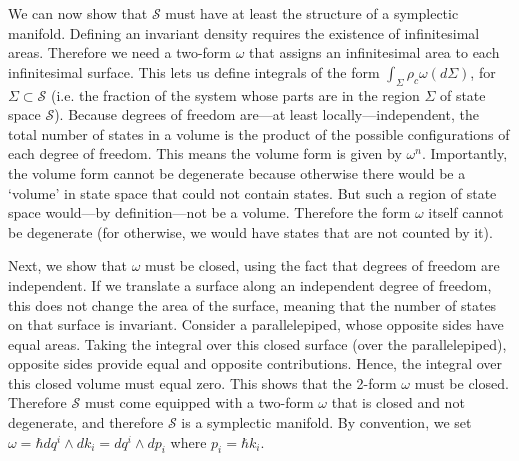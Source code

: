 \documentclass[letterpaper]{article}
\begin{document}
We can now show that $\mathcal{S}$ must have at least the structure of a symplectic manifold. Defining an invariant density requires the existence of infinitesimal areas. Therefore we need a two-form $\omega$ that assigns an infinitesimal area to each infinitesimal surface. This lets us define integrals of the form $\int_{\Sigma} \rho_c \omega(d\Sigma)$, for $\Sigma \subset \mathcal{S}$ (i.e. the fraction of the system whose parts are in the region $\Sigma$ of state space $\mathcal{S}$). Because degrees of freedom are---at least locally---independent, the total number of states in a volume is the product of the possible configurations of each degree of freedom. This means the volume form is given by $\omega^n$. Importantly, the volume form cannot be degenerate because otherwise there would be a `volume' in state space that could not contain states. But such a region of state space would---by definition---not be a volume. Therefore the form $\omega$ itself cannot be degenerate (for otherwise, we would have states that are not counted by it). 

Next, we show that $\omega$ must be closed, using the fact that degrees of freedom are independent. If we translate a surface along an independent degree of freedom, this does not change the area of the surface, meaning that the number of states on that surface is invariant. Consider a parallelepiped, whose opposite sides have equal areas. Taking the integral over this closed surface (over the parallelepiped), opposite sides provide equal and opposite contributions. Hence, the integral over this closed volume must equal zero. This shows that the 2-form $\omega$ must be closed. Therefore $\mathcal{S}$ must come equipped with a two-form $\omega$ that is closed and not degenerate, and therefore $\mathcal{S}$ is a symplectic manifold. By convention, we set $\omega = \hbar dq^i \wedge dk_i = dq^i \wedge dp_i$ where $p_i = \hbar k_i$.
\end{document}
